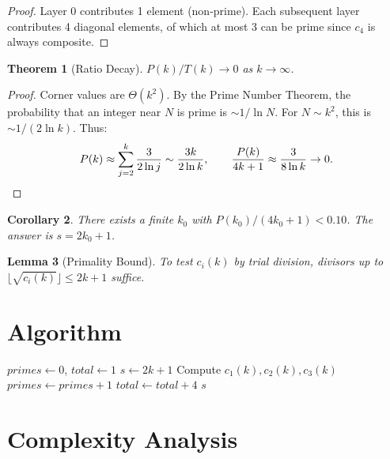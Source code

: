 \documentclass[12pt,a4paper]{article}
\newtheorem{theorem}{Theorem}
\newtheorem{lemma}[theorem]{Lemma}
\newtheorem{corollary}[theorem]{Corollary}
\theoremstyle{definition}
\theoremstyle{remark}
\begin{document}
\begin{proof}
Layer 0 contributes 1 element (non-prime). Each subsequent layer contributes 4 diagonal elements, of which at most 3 can be prime since $c_4$ is always composite.
\end{proof}

\begin{theorem}[Ratio Decay]
$P(k)/T(k) \to 0$ as $k \to \infty$.
\end{theorem}

\begin{proof}
Corner values are $\Theta(k^2)$. By the Prime Number Theorem, the probability that an integer near $N$ is prime is $\sim 1/\ln N$. For $N \sim k^2$, this is $\sim 1/(2\ln k)$. Thus:
\[
P(k) \approx \sum_{j=2}^{k} \frac{3}{2\ln j} \sim \frac{3k}{2\ln k}, \qquad
\frac{P(k)}{4k+1} \approx \frac{3}{8\ln k} \to 0. \qedhere
\]
\end{proof}

\begin{corollary}
There exists a finite $k_0$ with $P(k_0)/(4k_0 + 1) < 0.10$. The answer is $s = 2k_0 + 1$.
\end{corollary}

\begin{lemma}[Primality Bound]
To test $c_i(k)$ by trial division, divisors up to $\lfloor\sqrt{c_i(k)}\rfloor \leq 2k+1$ suffice.
\end{lemma}

\section{Algorithm}

\begin{algorithm}[H]
\caption{Find Spiral Prime Threshold}
\begin{algorithmic}[1]
\State $\textit{primes} \gets 0$, $\textit{total} \gets 1$
    \State $s \gets 2k + 1$
    \State Compute $c_1(k), c_2(k), c_3(k)$
            \State $\textit{primes} \gets \textit{primes} + 1$
        \EndIf
    \EndFor
    \State $\textit{total} \gets \textit{total} + 4$
        \State \Return $s$
    \EndIf
\EndFor
\end{algorithmic}
\end{algorithm}

\section{Complexity Analysis}
\end{document}
